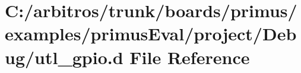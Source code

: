 \hypertarget{boards_2primus_2examples_2primus_eval_2project_2_debug_2utl__gpio_8d}{\section{C\-:/arbitros/trunk/boards/primus/examples/primus\-Eval/project/\-Debug/utl\-\_\-gpio.d File Reference}
\label{boards_2primus_2examples_2primus_eval_2project_2_debug_2utl__gpio_8d}
}
